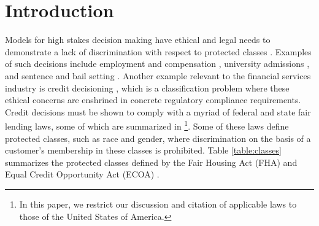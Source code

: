 \section{Introduction}

Models for high stakes decision making have ethical and legal needs to demonstrate a lack of discrimination with respect to protected classes \cite{Munoz2016,Barocas:2016aa}.
Examples of such decisions include employment and compensation \cite{Conway1983,Greene1984}, university admissions \cite{Bickel1975}, and sentence and bail setting \cite{Berk2017,Chouldechova2017,Dressel2018}.
Another example relevant to the financial services industry is credit decisioning \cite{Chen2018}, which is a classification problem where these ethical concerns are enshrined in concrete regulatory compliance requirements.
Credit decisions must be shown to comply with a myriad of federal and state fair lending laws, some of which are summarized in \cite{Chen2018}%
\footnote{In this paper, we restrict our discussion and citation of applicable laws to those of the United States of America.}.
Some of these laws define protected classes, such as race and gender,
where discrimination on the basis of a customer's membership in these classes is prohibited. Table \ref{table:classes} summarizes the protected classes defined by the Fair Housing Act (FHA) \cite{fha} and Equal Credit Opportunity Act (ECOA) \cite{ecoa}. 




